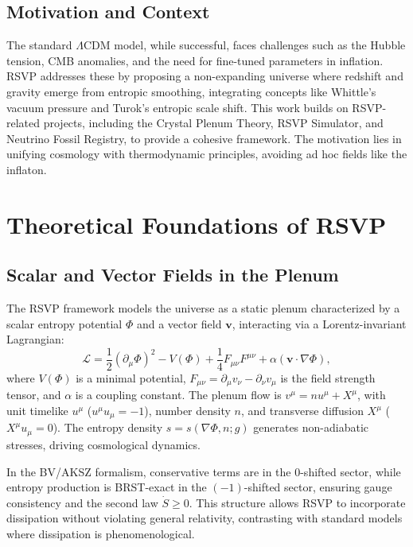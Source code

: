 \documentclass[12pt, a4paper, openany]{book}
\theoremstyle{definition}
\begin{document}
\section{Motivation and Context}
The standard $\Lambda$CDM model, while successful, faces challenges such as the Hubble tension, CMB anomalies, and the need for fine-tuned parameters in inflation. RSVP addresses these by proposing a non-expanding universe where redshift and gravity emerge from entropic smoothing, integrating concepts like Whittle’s vacuum pressure and Turok’s entropic scale shift. This work builds on RSVP-related projects, including the Crystal Plenum Theory, RSVP Simulator, and Neutrino Fossil Registry, to provide a cohesive framework. The motivation lies in unifying cosmology with thermodynamic principles, avoiding ad hoc fields like the inflaton.

\chapter{Theoretical Foundations of RSVP}
\section{Scalar and Vector Fields in the Plenum}
The RSVP framework models the universe as a static plenum characterized by a scalar entropy potential $\Phi$ and a vector field $\mathbf{v}$, interacting via a Lorentz-invariant Lagrangian:
\begin{equation}
\mathcal{L} = \frac{1}{2} (\partial_{\mu} \Phi)^2 - V(\Phi) + \frac{1}{4} F_{\mu\nu} F^{\mu\nu} + \alpha (\mathbf{v} \cdot \nabla \Phi),
\end{equation}
where $V(\Phi)$ is a minimal potential, $F_{\mu\nu} = \partial_{\mu} v_{\nu} - \partial_{\nu} v_{\mu}$ is the field strength tensor, and $\alpha$ is a coupling constant. The plenum flow is $v^\mu = n u^\mu + X^\mu$, with unit timelike $u^\mu$ ($u^\mu u_\mu = -1$), number density $n$, and transverse diffusion $X^\mu$ ($X^\mu u_\mu = 0$). The entropy density $s = s(\nabla \Phi, n; g)$ generates non-adiabatic stresses, driving cosmological dynamics.

In the BV/AKSZ formalism, conservative terms are in the 0-shifted sector, while entropy production is BRST-exact in the $(-1)$-shifted sector, ensuring gauge consistency and the second law $\dot{S} \ge 0$. This structure allows RSVP to incorporate dissipation without violating general relativity, contrasting with standard models where dissipation is phenomenological.
\end{document}

